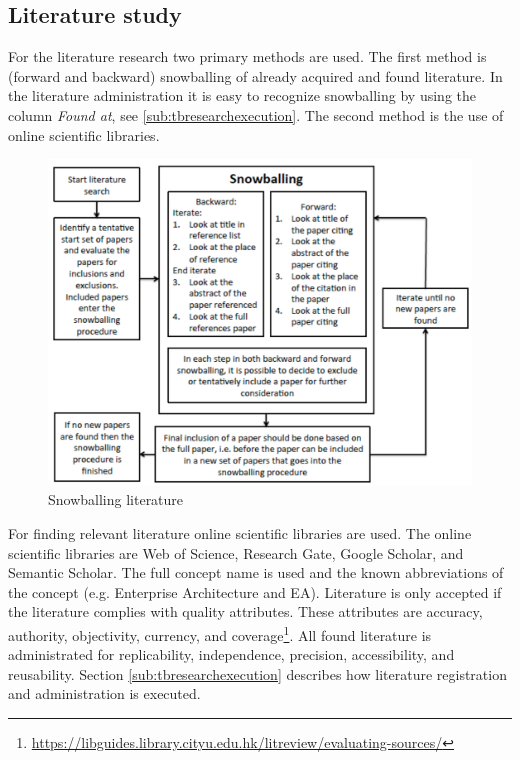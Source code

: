 \subsection{Literature study}
\label{sub:literaturestudy}
For the literature research two primary methods are used. The first method is (forward and backward) snowballing of already acquired and found literature. In the literature administration it is easy to recognize snowballing by using the column \textit{Found at}, see \cref{sub:tbresearchexecution}. The second method is the use of online scientific libraries.
\begin{figure}[H]
	\centering
	\includegraphics[width=0.6\linewidth]{images/snowball}
	\caption[Snowballing literature]{Snowballing literature \parencite{Wohlin2014}}
	\label{fig:snowball}
\end{figure}
For finding relevant literature online scientific libraries are used. The online scientific libraries are Web of Science, Research Gate, Google Scholar, and Semantic Scholar. The full concept name is used and the known abbreviations of the concept (e.g. Enterprise Architecture and EA). Literature is only accepted if the literature complies with quality attributes. These attributes are accuracy, authority, objectivity, currency, and coverage\footnote{\url{https://libguides.library.cityu.edu.hk/litreview/evaluating-sources/}}. All found literature is administrated for replicability, independence, precision, accessibility, and reusability. Section \ref{sub:tbresearchexecution} describes how literature registration and administration is executed.
